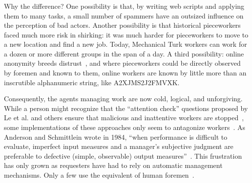 \documentclass[pn4226]{subfiles}
\begin{document}
\subsubsection{\whatchanged}

\begin{comment}
	*workers make little money but love autonomy --- workers make little money
	workers blamed for quality --- ???
	both cases, sociality is hard
	*collective action hard --- collective action succeeded
	- algorithms, not managers
\end{comment}

Why the difference?
One possibility is that, by writing web scripts and applying them to many tasks,
a small number of spammers have an outsized influence on the perception of bad actors.
Another possibility is that historical pieceworkers faced much more risk in shirking:
it was much harder for pieceworkers to move to a new location and find a new job.
Today, Mechanical Turk workers can work for a dozen or more different groups in the span of a day.
A third possibility: online anonymity breeds distrust~\cite{friedman2000trust}, and
where pieceworkers could be directly observed by foremen and known to them,
online workers are known by little more than an inscrutible alphanumeric string, like A2XJMS2J2FMVXK.



Consequently,
the agents managing work are now
cold, logical, and unforgiving.
While a person might recognize that the ``attention check'' questions
proposed by Le et al. and others ensure that
malicious and inattentive workers are stopped~\cite{le2010ensuring,AAAIW113995},
some implementations of these approaches
only seem to antagonize workers~\cite{takingAHITMcInnis}.
As Anderson and Schmittlein wrote in 1984,
``when performance is difficult to evaluate,
imperfect input measures and
a manager's subjective judgment are preferable to
defective (simple, observable) output measures''~\cite{10.2307/2555446}.
This frustration has only grown as requesters have had to rely on automatic management mechanisms.
Only a few use the equivalent of human foremen~\cite{haas2015argonaut,kulkarni2012mobileworks}.
\end{document}
